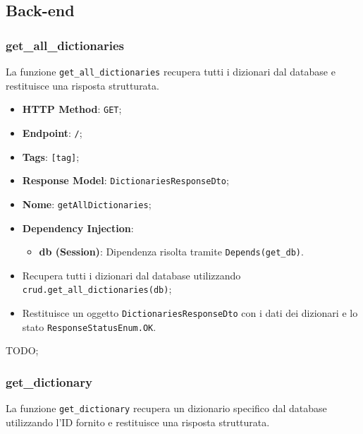\subsection{Back-end}


\subsubsection{get\_all\_dictionaries}

\par La funzione \texttt{get\_all\_dictionaries} recupera tutti i dizionari dal database e restituisce una risposta strutturata.

\begin{itemize}
 \item \textbf{HTTP Method}: \texttt{GET};
 \item \textbf{Endpoint}: \texttt{/};
 \item \textbf{Tags}: \texttt{[tag]};
 \item \textbf{Response Model}: \texttt{DictionariesResponseDto};
 \item \textbf{Nome}: \texttt{getAllDictionaries};
 \item \textbf{Dependency Injection}:
  \begin{itemize}
    \item \textbf{db (Session)}: Dipendenza risolta tramite \texttt{Depends(get\_db)}.
  \end{itemize}
\end{itemize}

\begin{itemize}
 \item Recupera tutti i dizionari dal database utilizzando \texttt{crud.get\_all\_dictionaries(db)};
 \item Restituisce un oggetto \texttt{DictionariesResponseDto} con i dati dei dizionari e lo stato \texttt{ResponseStatusEnum.OK}.
\end{itemize}

\par TODO;

\subsubsection{get\_dictionary}

\par La funzione \texttt{get\_dictionary} recupera un dizionario specifico dal database utilizzando l'ID fornito e restituisce una risposta strutturata.

